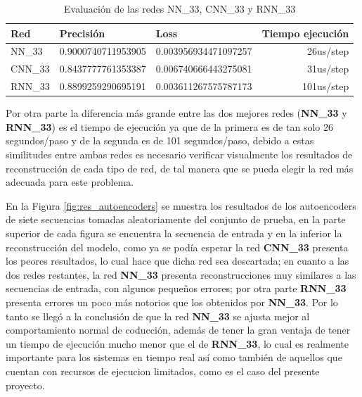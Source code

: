 \begin{table}[H]
\centering
\begin{center}
\begin{tabular}{|l|r|r|r|}
\hline
\textbf{Red} & \multicolumn{1}{l|}{\textbf{Precisi\'{o}n}} & \multicolumn{1}{l|}{\textbf{Loss}} & \multicolumn{1}{l|}{\textbf{Tiempo ejecuci\'{o}n}} \\ \hline
NN\_33              & 0.9000740711953905  & 0.003956934471097257  & 26us/step  \\ \hline
CNN\_33             & 0.8437777761353387  & 0.006740666443275081  & 31us/step  \\ \hline
RNN\_33             & 0.8899259290695191  & 0.003611267575787173  & 101us/step \\ \hline
\end{tabular}
\end{center}
\caption{Evaluaci\'{o}n de las redes NN\_33, CNN\_33 y RNN\_33}
\label{table:evaluacion_redes}
\end{table}

Por otra parte la diferencia m\'{a}s grande entre las dos mejores redes (\textbf{NN\_33} y \textbf{RNN\_33}) es el tiempo de ejecuci\'{o}n ya que de la primera es de tan solo 26 segundos/paso y de la segunda es de 101 segundos/paso, debido a estas similitudes entre ambas redes es necesario verificar visualmente los resultados de reconstrucci\'{o}n de cada tipo de red, de tal manera que se pueda elegir la red m\'{a}s adecuada para este problema. 

\vspace{5mm} %

En la Figura \ref{fig:res_autoencoders} se muestra los resultados de los autoencoders de siete secuencias tomadas aleatoriamente del conjunto de prueba, en la parte superior de cada figura se encuentra la secuencia de entrada y en la inferior la reconstrucci\'{o}n del modelo, como ya se pod\'{i}a esperar la red \textbf{CNN\_33} presenta los peores resultados, lo cual hace que dicha red sea descartada; en cuanto a las dos redes restantes, la red \textbf{NN\_33} presenta reconstrucciones muy similares a las secuencias de entrada, con algunos peque\~{n}os errores; por otra parte \textbf{RNN\_33} presenta errores un poco m\'{a}s notorios que los obtenidos por  \textbf{NN\_33}. Por lo tanto se lleg\'{o} a la conclusi\'{o}n de que la red \textbf{NN\_33} se ajusta mejor al comportamiento normal de coducci\'{o}n, adem\'{a}s de tener la gran ventaja de tener un tiempo de ejecuci\'{o}n mucho menor que el de \textbf{RNN\_33}, lo cual es realmente importante para los sistemas en tiempo real as\'{i} como tambi\'{e}n de aquellos que cuentan con recursos de ejecucion limitados, como es el caso del presente proyecto.

